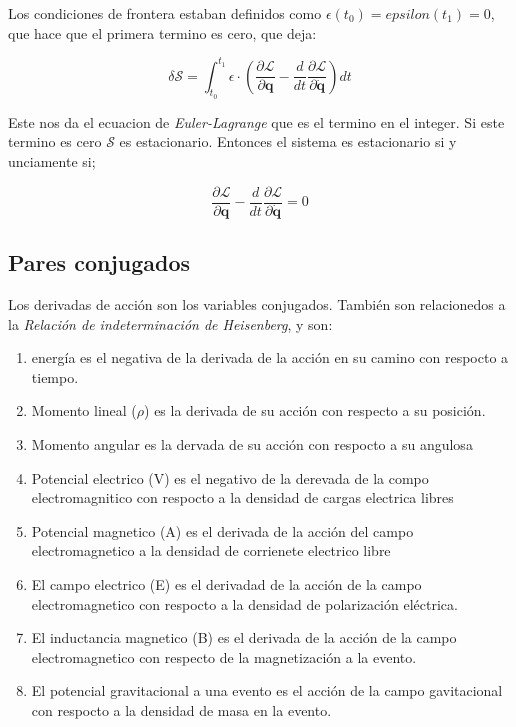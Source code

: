 { Los condiciones de frontera estaban definidos como $\epsilon(t_0)=epsilon(t_1)=0$, que hace que el primera termino es cero, que deja:
 
\begin{equation}
	\delta  \mathcal{S}=\int_{t_0}^{t_1} \epsilon \cdot 
	\left (  
		\frac {\partial  \mathcal{L}} {\partial \boldsymbol{q}}- \frac {d} {dt} \frac {\partial  \mathcal{L}} {\partial \dot{\boldsymbol{q}}}
	\right ) dt
\end{equation}

Este nos da el ecuacion de \emph{Euler-Lagrange} que es el termino en el integer. Si este termino es cero $ \mathcal{S}$ es estacionario. Entonces el sistema es estacionario si y unciamente si;

\begin{equation}
	\frac {\partial  \mathcal{L}} {\partial \boldsymbol{q}}- \frac {d} {dt} \frac {\partial  \mathcal{L}} {\partial \dot{\boldsymbol{q}}}=0
\end{equation}

\subsection{Pares conjugados}
Los derivadas de acci\'on son los variables conjugados. Tambi\'en son relacionedos a la \emph{Relación de indeterminación de Heisenberg}, y son:
\begin{enumerate}
	\item energ\'ia es el negativa de la derivada de la acci\'on en su camino con respocto a tiempo.
	\item Momento lineal ($\rho$) es la derivada de su acci\'on con respecto a su posici\'on.
	\item Momento angular  es la dervada de su acci\'on con respocto a su angulosa
	\item Potencial electrico (V) es el negativo de la derevada de la compo electromagnitico con respocto a la densidad de cargas electrica libres
	\item Potencial magnetico (A) es el derivada de la acci\'on del campo electromagnetico a la densidad de corrienete electrico libre
	\item El campo electrico (E) es el derivadad de la acci\'on de la campo electromagnetico con respocto a la densidad de polarización eléctrica.
	\item El inductancia magnetico (B) es el derivada de la acci\'on de la campo electromagnetico con respecto de la magnetizaci\'on a la evento.
	\item El potencial gravitacional a una evento es el acci\'on de la campo gavitacional con respocto a la densidad de masa en la evento.
\end{enumerate}

}
